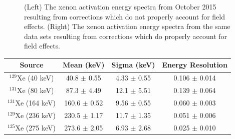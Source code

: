 \documentclass[a4paper,12pt]{article}
\begin{document}
{\begin{figure} [h!]
\centering
{}
\qquad
{}
\caption{ (Left) The xenon activation energy spectra from October 2015 resulting from corrections which do not properly account for field effects. (Right) The xenon activation energy spectra from the same data sets resulting from corrections which do properly account for field effects. }
\label{DDpeaks}
\end{figure}

\newpage

\begin{longtable}{|  c | c | c | c |} 
\hline
Source & Mean (keV) & Sigma (keV) & Energy Resolution \\ \hline \hline
$^{129}$Xe (40 keV) & 40.8 $\pm$ 0.55  & 4.33 $\pm$ 0.55 & 0.106 $\pm$ 0.014 \\ \hline

$^{131}$Xe (80 keV) & 87.3  $\pm$ 4.49  & 12.1  $\pm$ 5.51 & 0.139  $\pm$ 0.064 \\ \hline

$^{131}$Xe (164 keV) & 160.6  $\pm$ 0.52  & 9.56  $\pm$ 0.55 & 0.060  $\pm$ 0.003  \\ \hline
 
$^{129}$Xe (236 keV) & 230.5  $\pm$ 1.17 & 11.7  $\pm$ 1.35  & 0.051  $\pm$ 0.006  \\ \hline

$^{125}$Xe (275 keV) & 273.6 $\pm$ 2.05 & 6.93   $\pm$ 2.68 & 0.025   $\pm$ 0.010  \\ \hline
 

\end{longtable}}
\end{document}
